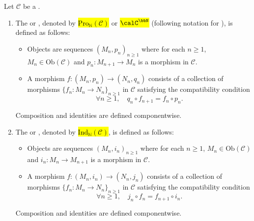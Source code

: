 \begin{definition}
\label{definition:category_of_inverse_direct_sequences_of_objects_in_a_category}
    Let $\mathcal{C}$ be a . 
    \begin{enumerate}
        \item  The  or , denoted by \hl{$\mathrm{Pro}_{\mathbb{N}}(\mathcal{C})$} or \hl{$\calC^\bbN$} (following notation for ), is defined as follows:
        \begin{itemize}
            \item Objects are sequences $(M_n, p_n)_{n \geq 1}$ where for each $n \geq 1$, $M_n \in \mathrm{Ob}(\mathcal{C})$ and $p_n : M_{n+1} \to M_n$ is a morphism in $\mathcal{C}$.
            \item A morphism $f : (M_n, p_n) \to (N_n, q_n)$ consists of a collection of morphisms $\{f_n : M_n \to N_n\}_{n \geq 1}$ in $\mathcal{C}$ satisfying the compatibility condition
            $$
            \forall n \geq 1, \quad q_n \circ f_{n+1} = f_n \circ p_n.
            $$
        \end{itemize}
        Composition and identities are defined componentwise. 



        \item The  or , denoted by \hl{$\mathrm{Ind}_{\mathbb{N}}(\mathcal{C})$}, is defined as follows:
        \begin{itemize}
            \item Objects are sequences $(M_n, i_n)_{n \geq 1}$ where for each $n \geq 1$, $M_n \in \mathrm{Ob}(\mathcal{C})$ and $i_n : M_n \to M_{n+1}$ is a morphism in $\mathcal{C}$.
            \item A morphism $f : (M_n, i_n) \to (N_n, j_n)$ consists of a collection of morphisms $\{f_n : M_n \to N_n\}_{n \geq 1}$ in $\mathcal{C}$ satisfying the compatibility condition
            $$
            \forall n \geq 1, \quad j_n \circ f_n = f_{n+1} \circ i_n.
            $$
        \end{itemize}
        Composition and identities are defined componentwise.
    \end{enumerate}


\end{definition}
